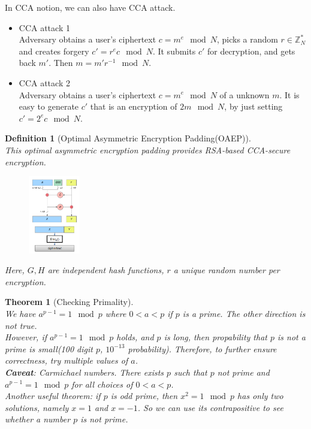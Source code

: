 \documentclass[12pt]{article}
\newtheorem{definition}{Definition}[section]
\newtheorem{theorem}{Theorem}[section]
\theoremstyle{definition}
\begin{document}
In CCA notion, we can also have CCA attack.
\begin{itemize}
  \item CCA attack 1\\
  Adversary obtains a user's ciphertext $c=m^e\mod N$, picks a random $r\in\mathbb{Z}_N^\ast$ and creates forgery $c'=r^ec\mod N$. It submits $c'$ for decryption, and gets back $m'$. Then $m=m'r^{-1}\mod N$.
  \item CCA attack 2\\
  Adversary obtains a user's ciphertext $c=m^e\mod N$ of a unknown $m$. It is easy to generate $c'$ that is an encryption of $2m\mod N$, by just setting $c'=2^ec\mod N$.
\end{itemize}
\begin{definition}[Optimal Asymmetric Encryption Padding(OAEP)]
\hfill\\\normalfont This optimal asymmetric encryption padding provides RSA-based CCA-secure encryption.
\begin{figure}[h]
\centering
\includegraphics[width=0.2\textwidth]{7.png}
\end{figure}
Here, $G,H$ are independent hash functions, $r$ a unique random number per encryption.
\end{definition}
\begin{theorem}[Checking Primality]
\hfill\\\normalfont We have $a^{p-1}=1\mod p$ where $0<a<p$ if $p$ is a prime. The other direction is not true.\\
However, if $a^{p-1}=1\mod p$ holds, and $p$ is long, then propability that $p$ is not a prime is small(100 digit $p$, $10^{-13}$ probability). Therefore, to further ensure correctness, try multiple values of $a$.\\
\textbf{Caveat}: Carmichael numbers. There exists $p$ such that $p$ not prime and $a^{p-1}=1\mod p$ for all choices of $0<a<p$.\\
Another useful theorem: if $p$ is odd prime, then $x^2=1\mod p$ has only two solutions, namely $x=1$ and $x=-1$. So we can use its contrapositive to see whether a number $p$ is not prime.
\end{theorem}
\end{document}
